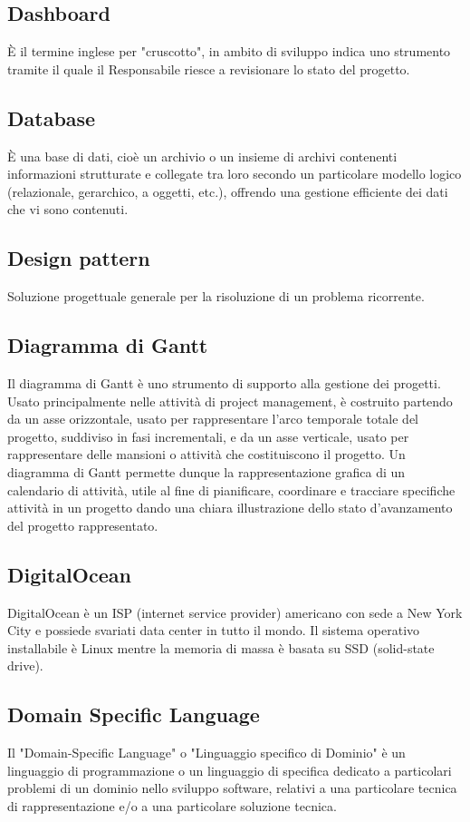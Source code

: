 \subsection{Dashboard}
È il termine inglese per "cruscotto", in ambito di sviluppo indica uno strumento
tramite il quale il Responsabile riesce a revisionare lo stato del progetto.

\subsection{Database}
È una base di dati, cioè un archivio o un insieme di archivi contenenti informazioni
strutturate e collegate tra loro secondo un particolare modello logico (relazionale, gerarchico,
a oggetti, etc.), offrendo una gestione efficiente dei dati che vi sono contenuti.

\subsection{Design pattern}
Soluzione progettuale generale per la risoluzione di un problema ricorrente.

\subsection{Diagramma di Gantt}
Il diagramma di Gantt è uno strumento di supporto alla gestione dei
progetti. Usato principalmente nelle attività di project management, è costruito partendo da
un asse orizzontale, usato per rappresentare l’arco temporale totale del progetto, suddiviso
in fasi incrementali, e da un asse verticale, usato per rappresentare delle mansioni o attività
che costituiscono il progetto. Un diagramma di Gantt permette dunque la rappresentazione
grafica di un calendario di attività, utile al fine di pianificare, coordinare e tracciare specifiche
attività in un progetto dando una chiara illustrazione dello stato d’avanzamento del progetto
rappresentato.

\subsection{DigitalOcean}
DigitalOcean è un ISP (internet service provider) americano con sede a New York City e possiede svariati data center in tutto il mondo. Il sistema operativo installabile è Linux mentre la memoria di massa è basata su SSD (solid-state drive).

\subsection{Domain Specific Language}
Il "Domain-Specific Language" o "Linguaggio specifico di Dominio" è un linguaggio
di programmazione o un linguaggio di specifica dedicato a particolari
problemi di un dominio nello sviluppo software, relativi a una particolare tecnica
di rappresentazione e/o a una particolare soluzione tecnica.

